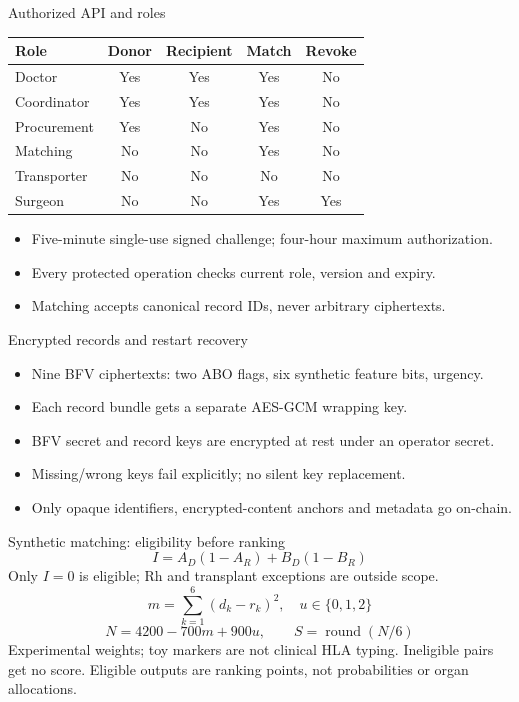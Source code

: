 \documentclass[10pt]{beamer}
\begin{document}
\begin{frame}{Authorized API and roles}
\small
\begin{tabular}{lcccc}\toprule
Role & Donor & Recipient & Match & Revoke\\\midrule
Doctor & Yes & Yes & Yes & No\\
Coordinator & Yes & Yes & Yes & No\\
Procurement & Yes & No & Yes & No\\
Matching & No & No & Yes & No\\
Transporter & No & No & No & No\\
Surgeon & No & No & Yes & Yes\\\bottomrule
\end{tabular}
\vspace{1em}
\begin{itemize}
\item Five-minute single-use signed challenge; four-hour maximum authorization.
\item Every protected operation checks current role, version and expiry.
\item Matching accepts canonical record IDs, never arbitrary ciphertexts.
\end{itemize}
\end{frame}
\begin{frame}{Encrypted records and restart recovery}
\begin{itemize}
\item Nine BFV ciphertexts: two ABO flags, six synthetic feature bits, urgency.
\item Each record bundle gets a separate AES-GCM wrapping key.
\item BFV secret and record keys are encrypted at rest under an operator secret.
\item Missing/wrong keys fail explicitly; no silent key replacement.
\item Only opaque identifiers, encrypted-content anchors and metadata go on-chain.
\end{itemize}
\end{frame}
\begin{frame}{Synthetic matching: eligibility before ranking}
\[
I=A_D(1-A_R)+B_D(1-B_R)
\]
Only $I=0$ is eligible; Rh and transplant exceptions are outside scope.
\[
m=\sum_{k=1}^{6}(d_k-r_k)^2,\quad u\in\{0,1,2\}
\]
\[
N=4200-700m+900u,\qquad S=\operatorname{round}(N/6)
\]
Experimental weights; toy markers are not clinical HLA typing. Ineligible pairs get no score. Eligible outputs are ranking points, not probabilities or organ allocations.
\end{frame}
\end{document}
